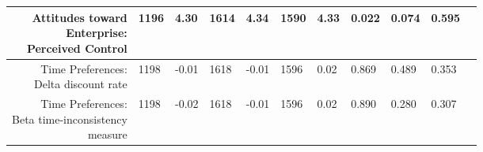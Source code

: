 \begin{longtable}{|r|l|l|l|l|l|l|l|l|l|l}
\hline

	 \makecell{Attitudes toward\\ Enterprise:\\ Perceived Control}                     & 1196                                                               &  4.30                                                              & 1614                                                               &  4.34                                                              & 1590                                                               &  4.33                                                              & 0.022                                                              & 0.074                                                              & 0.595                                                             \\

\hline

	 \makecell{Time Preferences:\\ Delta discount rate}                              & 1198                                                               & -0.01                                                              & 1618                                                               & -0.01                                                              & 1596                                                               &  0.02                                                              & 0.869                                                              & 0.489                                                              & 0.353                                                             \\

\hline

	 \makecell{Time Preferences:\\ Beta time-inconsistency\\measure}                  & 1198                                                               & -0.02                                                              & 1618                                                               & -0.01                                                              & 1596                                                               &  0.02                                                              & 0.890                                                              & 0.280                                                              & 0.307                                                             \\


\end{longtable}
